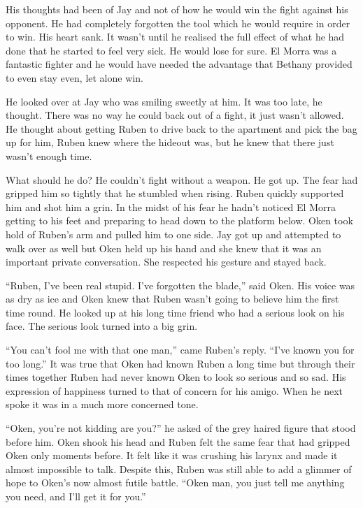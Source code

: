 His thoughts had been of Jay and not of how he would win the fight against his opponent.  He had completely forgotten the tool which he would require in order to win.  His heart sank.  It wasn't until he realised the full effect of what he had done that he started to feel very sick.  He would lose for sure.  El Morra was a fantastic fighter and he would have needed the advantage that Bethany provided to even stay even, let alone win.

He looked over at Jay who was smiling sweetly at him.  It was too late, he thought.  There was no way he could back out of a fight, it just wasn't allowed.  He thought about getting Ruben to drive back to the apartment and pick the bag up for him, Ruben knew where the hideout was, but he knew that there just wasn't enough time.  

What should he do?  He couldn't fight without a weapon.  He got up.  The fear had gripped him so tightly that he stumbled when rising.  Ruben quickly supported him and shot him a grin.  In the midst of his fear he hadn't noticed El Morra getting to his feet and preparing to head down to the platform below.  Oken took hold of Ruben's arm and pulled him to one side.  Jay got up and attempted to walk over as well but Oken held up his hand and she knew that it was an important private conversation.  She respected his gesture and stayed back.

``Ruben, I've been real stupid.  I've forgotten the blade,'' said Oken.  His voice was as dry as ice and Oken knew that Ruben wasn't going to believe him the first time round.  He looked up at his long time friend who had a serious look on his face.  The serious look turned into a big grin.

``You can't fool me with that one man,'' came Ruben's reply.  ``I've known you for too long.''  It was true that Oken had known Ruben a long time but through their times together Ruben had never known Oken to look so serious and so sad.  His expression of happiness turned to that of concern for his amigo.  When he next spoke it was in a much more concerned tone.

``Oken, you're not kidding are you?'' he asked of the grey haired figure that stood before him.  Oken shook his head and Ruben felt the same fear that had gripped Oken only moments before.  It felt like it was crushing his larynx and made it almost impossible to talk.  Despite this, Ruben was still able to add a glimmer of hope to Oken's now almost futile battle.  ``Oken man, you just tell me anything you need, and I'll get it for you.''

